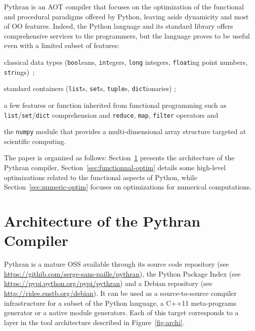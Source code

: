\documentclass{llncs}
\begin{document}
Pythran\cite{pythran2013} is an \ac{AOT} compiler that focuses on the
optimization of the functional and procedural paradigms offered by Python,
leaving aside dynamicity and most of \ac{OO} features.  Indeed, the Python
language and its standard library offers comprehensive services to the
programmers, but the language proves to be useful even with a limited subset of
features:
\begin{inparaenum}[1)]
\item classical data types (\texttt{bool}eans, \texttt{int}egers,
\texttt{long} integers, \texttt{float}ing point numbers, \texttt{str}ings)~;
\item standard containers (\texttt{list}s, \texttt{set}s, \texttt{tuple}s,
\texttt{dict}ionaries) ;
\item a few features or function inherited from
functional programming such as \texttt{list}/\texttt{set}/\texttt{dict}
comprehension and \texttt{reduce}, \texttt{map}, \texttt{filter} operators and
\item the \texttt{numpy} module that
provides a multi-dimensional array structure targeted at scientific computing. 
\end{inparaenum}

The paper is organized as follows: Section~\ref{sec:architecture} presents the
architecture of the Pythran compiler, Section~\ref{sec:functionnal-optim}
details some high-level optimizations related to the functional aspects of
Python, while Section~\ref{sec:numeric-optim} focuses on optimizations for
numerical computations.

\section{Architecture of the Pythran Compiler}
\label{sec:architecture}

Pythran is a mature \ac{OSS} available through its source code
repository (see \url{https://githib.com/serge-sans-paille/pythran}), the
Python Package Index (see \url{https://pypi.python.org/pypi/pythran}) and
a Debian repository (see \url{http://ridee.enstb.org/debian}). It can be
used as a source-to-source compiler infrastructure for a subset of the Python
language, a C++11 meta-programs generator or a native module generators. Each
of this target corresponds to a layer in the tool architecture described in
Figure~\ref{fig:archi}.
\end{document}
